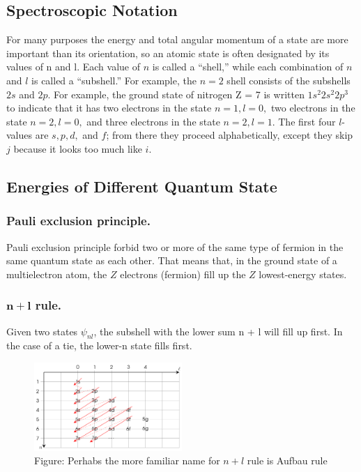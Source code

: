 \documentclass[../main.tex]{subfiles}
\begin{document}
\subsection*{Spectroscopic Notation} 
For many purposes the energy and total angular momentum of a state are more important than its orientation, so an atomic state is often designated by its values of n and l. Each value of $n$ is called a “shell,” while each combination of $n$ and $l$ is called a “subshell.” For example, the $n = 2$ shell consists of the subshells $2s$ and $2p$. For example, the ground state of nitrogen Z = 7 is written $1s^2 2s^2 2p^3$ to indicate that it has two electrons in the state $n = 1, l = 0,$ two electrons in the state $n = 2, l = 0,$ and three electrons in the state $n = 2, l = 1$. The first four $l$-values are $s, p, d,$ and $f$; from there they proceed alphabetically, except they skip $j$ because it looks too much like $i$.

\subsection*{Energies of Different Quantum State}
\subsubsection*{Pauli exclusion principle.} Pauli exclusion principle forbid two or more of the same type of fermion in the same quantum state as each other. That means that, in the ground state of a multielectron atom, the $Z$ electrons (fermion) fill up the $Z$ lowest-energy states.

\subsubsection*{$\boldsymbol{n + l}$ rule.} Given two states $\psi_{nl}$, the subshell with the lower sum n + l will fill up first. In the case of a tie, the lower-n state fills first.
\begin{figure}[b]
    \centering
    \includegraphics[width=0.5\textwidth]{../Rss/HA/Aufbau.png}
    \caption*{Figure: Perhabs the more familiar name for $n+l$ rule is Aufbau rule}
\end{figure}
\end{document}
